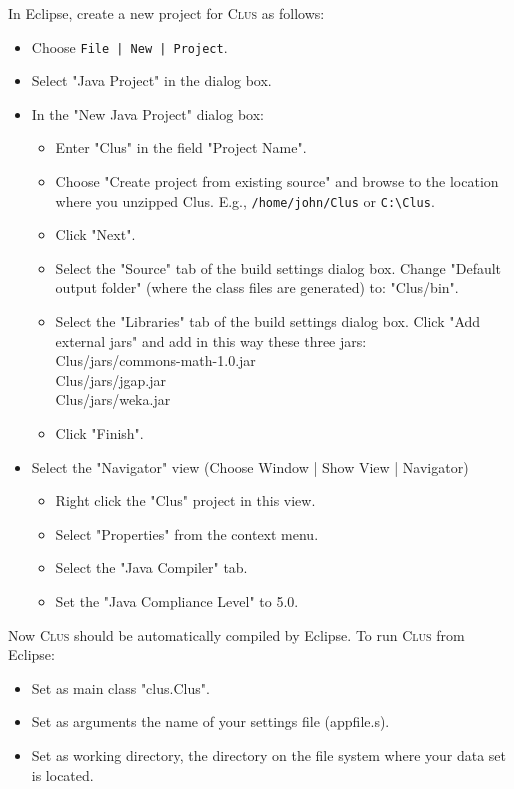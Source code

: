 \documentclass[a4paper]{report}
\newcommand{\clus}{\textsc{Clus}}
\begin{document}
In Eclipse, create a new project for \clus{} as follows:

\begin{itemize}
\item Choose \verb^File | New | Project^.
\item Select "Java Project" in the dialog box.
\item In the "New Java Project" dialog box:
 \begin{itemize}
 \item Enter "Clus" in the field "Project Name".
 \item Choose "Create project from existing source" and browse to the location where 
      you unzipped Clus. E.g., \verb^/home/john/Clus^ or \verb^C:\Clus^.
 \item Click "Next".
 \item Select the "Source" tab of the build settings dialog box.
     Change "Default output folder" (where the class files are generated) to: "Clus/bin".
 \item Select the "Libraries" tab of the build settings dialog box.
     Click "Add external jars" and add in this way these three jars:\\
        Clus/jars/commons-math-1.0.jar\\
        Clus/jars/jgap.jar\\
        Clus/jars/weka.jar
 \item Click "Finish".
 \end{itemize}
\item Select the "Navigator" view (Choose Window | Show View | Navigator)
 \begin{itemize}
   \item  Right click the "Clus" project in this view.
   \item  Select "Properties" from the context menu.
   \item  Select the "Java Compiler" tab.
   \item  Set the "Java Compliance Level" to 5.0.
 \end{itemize}
\end{itemize}
Now \clus{} should be automatically compiled by Eclipse.
To run \clus{} from Eclipse:
 \begin{itemize}
   \item Set as main class "clus.Clus".
   \item Set as arguments the name of your settings file (appfile.s).
   \item Set as working directory, the directory on the file system where your data set is located.
\end{itemize}
\end{document}
